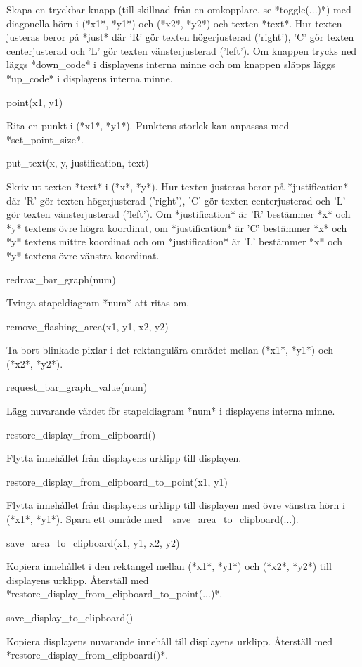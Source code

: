 \documentclass[10pt,oneside,swedish]{lips-no_customer}
\begin{document}
Skapa en tryckbar knapp (till skillnad från en omkopplare, se
*toggle(...)*) med diagonella hörn i (*x1*, *y1*) och (*x2*, *y2*) och
texten *text*. Hur texten justeras beror på *just* där 'R' gör texten
högerjusterad ('right'), 'C' gör texten centerjusterad och 'L' gör
texten vänsterjusterad ('left'). Om knappen trycks ned läggs
*down\_code* i displayens interna minne och om knappen släpps läggs
*up\_code* i displayens interna minne.

point(x1, y1)

Rita en punkt i (*x1*, *y1*). Punktens storlek kan anpassas med
*set\_point\_size*.

put\_text(x, y, justification, text)

Skriv ut texten *text* i (*x*, *y*). Hur texten justeras beror på
*justification* där 'R' gör texten högerjusterad ('right'), 'C' gör
texten centerjusterad och 'L' gör texten vänsterjusterad ('left'). Om
*justification* är 'R' bestämmer *x* och *y* textens övre högra
koordinat, om *justification* är 'C' bestämmer *x* och *y* textens
mittre koordinat och om *justification* är 'L' bestämmer *x* och *y*
textens övre vänstra koordinat.

redraw\_bar\_graph(num)

Tvinga stapeldiagram *num* att ritas om.

remove\_flashing\_area(x1, y1, x2, y2)

Ta bort blinkade pixlar i det rektangulära området mellan (*x1*, *y1*)
och (*x2*, *y2*).

request\_bar\_graph\_value(num)

Lägg nuvarande värdet för stapeldiagram *num* i displayens interna
minne.

restore\_display\_from\_clipboard()

Flytta innehållet från displayens urklipp till displayen.

restore\_display\_from\_clipboard\_to\_point(x1, y1)

Flytta innehållet från displayens urklipp till displayen med övre
vänstra hörn i (*x1*, *y1*). Spara ett område med
\_save\_area\_to\_clipboard(...).

save\_area\_to\_clipboard(x1, y1, x2, y2)

Kopiera innehållet i den rektangel mellan (*x1*, *y1*) och (*x2*, *y2*)
till displayens urklipp. Återställ med
*restore\_display\_from\_clipboard\_to\_point(...)*.

save\_display\_to\_clipboard()

Kopiera displayens nuvarande innehåll till displayens urklipp. Återställ
med *restore\_display\_from\_clipboard()*.
\end{document}
